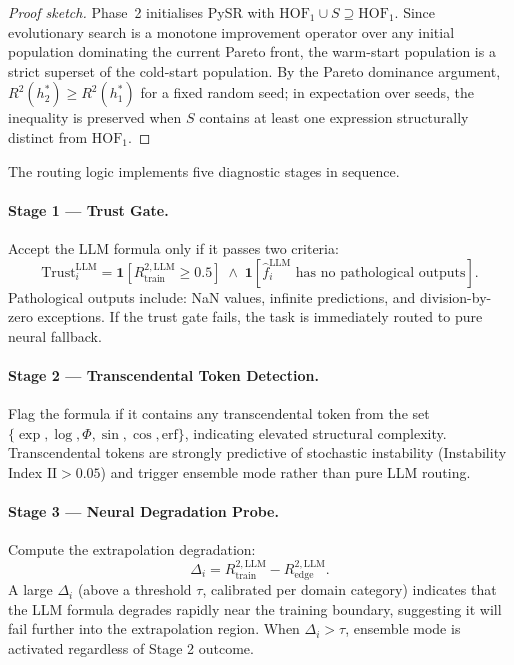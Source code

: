 \documentclass[twoside,11pt]{article}
\newcommand{\II}{\mathrm{II}}
\begin{document}
\begin{proof}[Proof sketch]
Phase~2 initialises PySR with $\mathrm{HOF}_1 \cup S \supseteq \mathrm{HOF}_1$.
Since evolutionary search is a monotone improvement operator over any
initial population dominating the current Pareto front, the warm-start
population is a strict superset of the cold-start population.
By the Pareto dominance argument, $R^2(h^*_2) \geq R^2(h^*_1)$
for a fixed random seed; in expectation over seeds, the inequality is
preserved when $S$ contains at least one expression structurally
distinct from $\mathrm{HOF}_1$.
\end{proof}

The routing logic implements five diagnostic stages in sequence.

\paragraph{Stage 1 --- Trust Gate.}
Accept the LLM formula only if it passes two criteria:
\begin{equation}
  \text{Trust}_i^{\mathrm{LLM}} = \mathbf{1}\!\left[{R^{2,\mathrm{LLM}}_{\mathrm{train}}} \ge 0.5\right]
  \;\land\; \mathbf{1}\!\left[\hat{f}^{\mathrm{LLM}}_i \text{ has no pathological outputs}\right].
  \label{eq:trust}
\end{equation}
Pathological outputs include: NaN values, infinite predictions, and division-by-zero
exceptions.  If the trust gate fails, the task is immediately routed to pure neural
fallback.

\paragraph{Stage 2 --- Transcendental Token Detection.}
Flag the formula if it contains any transcendental token from the set
$\{\exp, \log, \Phi, \sin, \cos, \mathrm{erf}\}$, indicating elevated structural
complexity.  Transcendental tokens are strongly predictive of stochastic instability
(Instability Index $\II > 0.05$) and trigger ensemble mode rather than pure LLM
routing.

\paragraph{Stage 3 --- Neural Degradation Probe.}
Compute the extrapolation degradation:
\begin{equation}
  \Delta_i = {R^{2,\mathrm{LLM}}_{\mathrm{train}}} - {R^{2,\mathrm{LLM}}_{\mathrm{edge}}}.
  \label{eq:degradation}
\end{equation}
A large $\Delta_i$ (above a threshold $\tau$, calibrated per domain category)
indicates that the LLM formula degrades rapidly near the training boundary,
suggesting it will fail further into the extrapolation region.  When $\Delta_i > \tau$,
ensemble mode is activated regardless of Stage 2 outcome.
\end{document}
